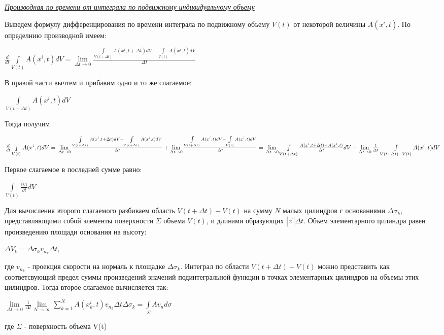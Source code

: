 \begin{center}
  \textit{\underline{Производная по времени от интеграла по подвижному индивидуальному объему}}
\end{center}
Выведем формулу дифференцирования по времени интеграла по подвижному объему $V(t)$ от некоторой величины $A(x^i, t)$. По определнию производной имеем:
\begin{center}$
    \frac{d}{dt} \int\limits_{V(t)} A(x^i,t) dV =
    \lim\limits_{\Delta t \to 0} \frac{\int\limits_{V(t + \Delta t)} A(x^i,t + \Delta t)dV - \int\limits_{V(t)}A(x^i,t)dV}{\Delta t}
  $\end{center}
В правой части вычтем и прибавим одно и то же слагаемое:
\begin{center}$
    \int\limits_{V(t + \Delta t)} A(x^i, t)dV
  $\end{center}
Тогда получим
\begin{center}$
    \frac{d}{dt} \int\limits_{V(t)} A(x^i,t) dV
    =\newline
    \lim\limits_{\Delta t \to 0} \frac{\int\limits_{V(t + \Delta t)} A(x^i,t + \Delta t)dV - \int\limits_{V(t + \Delta t)}A(x^i,t)dV}{\Delta t}
    +
    \lim\limits_{\Delta t \to 0} \frac{\int\limits_{V(t + \Delta t)} A(x^i,t)dV - \int\limits_{V(t)}A(x^i,t)dV}{\Delta t}
    =\newline
    \lim\limits_{\Delta t \to 0}\int\limits_{V(t + \Delta t)} \frac{A(x^i, t + \Delta t) - A(x^i, t)}{\Delta t}dV
    +
    \lim\limits_{\Delta t \to 0}\frac{1}{\Delta t}\int\limits_{V(t + \Delta t) - V(t)}A(x^i, t)dV
  $\end{center}
Первое слагаемое в последней сумме равно:
\begin{center}$
    \int\limits_{V(t)}\frac{\partial A}{\partial t}dV
  $\end{center}
Для вычисления второго слагаемого разбиваем область $V(t + \Delta t) - V(t)$ на сумму $N$ малых цилиндров с основаниями $\Delta \sigma_k$, представляющими собой элементы поверхности $\Sigma$ объема $V(t)$, и длинами образующих $|\Vec{v}|\Delta
  t$. Объем элементарного цилиндра равен произведению площади основания на высоту:
\begin{center}$
    \Delta V_k = \Delta \sigma_k v_{n_k} \Delta t,
  $\end{center}
где $v_{n_k}$ - проекция скорости на нормаль к площадке $\Delta \sigma_k$. Интеграл по области $V(t + \Delta t) - V(t)$ можно представить как соответсвующий предел суммы произведений значений подинтегральной функции в точках элементарных цилиндров на объемы этих цилиндров. Тогда второе слагаемое вычисляется так:
\begin{center}$
    \lim\limits_{\Delta t \to 0} \frac{1}{\Delta t}\lim\limits_{N \to \infty}\sum_{k=1}^{N}A(x_k^i,t)v_{n_k}\Delta t \Delta \sigma_k
    =
    \int\limits_{\Sigma}Av_n d\sigma
  $\end{center}
где $\Sigma$ - поверхность объема V(t)

